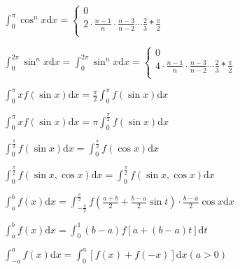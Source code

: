 \noindent $\int_{0}^{\pi}{\cos^n{x}}\mathrm{d}x = \begin{cases}
    0 \\
    2 \cdot \frac{n - 1}{n} \cdot \frac{n - 3}{n - 2} \cdots \frac{2}{3} * \frac{\pi}{2} \\
\end{cases}$

\noindent $\int_{0}^{2\pi}{\sin^n{x}}\mathrm{d}x = \int_{0}^{2\pi}{\sin^n{x}}\mathrm{d}x =
\begin{cases}
    0 \\
    4 \cdot \frac{n - 1}{n} \cdot \frac{n - 3}{n - 2} \cdots \frac{2}{3} * \frac{\pi}{2} \\
\end{cases}$

\begin{multicols}{2}
    \begin{spacing}{\hangju}
        \noindent $\int_{0}^{\pi}{xf(\sin{x})}\mathrm{d}x = \frac{\pi}{2}\int_{0}^{\pi}{f(\sin{x})}\mathrm{d}x$

        \noindent $\int_{0}^{\pi}{xf(\sin{x})}\mathrm{d}x = \pi\int_{0}^{\frac{\pi}{2}}{f(\sin{x})}\mathrm{d}x$

        \noindent $\int_{0}^{\frac{\pi}{2}}{f(\sin{x})}\mathrm{d}x = \int_{0}^{\frac{\pi}{2}}{f(\cos{x})}\mathrm{d}x $
    \end{spacing}
\end{multicols}

\noindent $\int_{0}^{\frac{\pi}{2}}{f(\sin{x}, \cos{x})}\mathrm{d}x = \int_{0}^{\frac{\pi}{2}}{f(\sin{x}, \cos{x})}\mathrm{d}x $

\noindent $\int_{a}^{b}{f(x)}\mathrm{d}x = \int_{-\frac{\pi}{2}}^{\frac{\pi}{2}}{f(\frac{a + b}{2} + \frac{b - a}{2}\sin{t}) \cdot \frac{b - a}{2}\cos{x}}\mathrm{d}x$

\noindent $\int_{a}^{b}{f(x)}\mathrm{d}x = \int_{0}^{1}(b - a)f[a + (b - a)t]\mathrm{d}t$

\noindent $\int_{-a}^{a}{f(x)}\mathrm{d}x = \int_{0}^{a}[f(x) + f(-x)]\mathrm{d}x (a > 0)$
